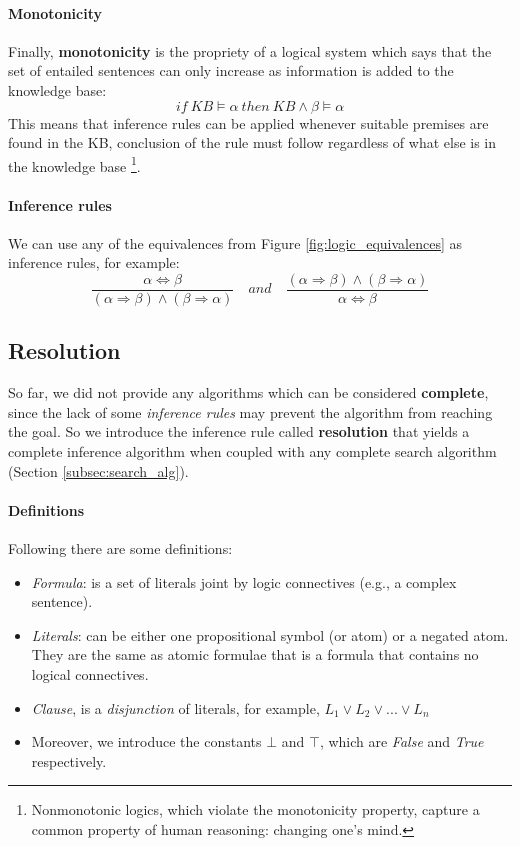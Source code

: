\documentclass[10pt,a4paper]{article}
\begin{document}
\paragraph{Monotonicity}
Finally, \textbf{monotonicity} is the propriety of a logical system  which says that the set of entailed sentences can only increase as information is added to the knowledge base:
\[if\ KB\models \alpha\ then \ KB\wedge\beta\models\alpha\]
This means that inference rules can be applied whenever suitable premises are found in the KB, conclusion of the rule must follow regardless of what else is in the knowledge base \footnote{Nonmonotonic logics, which violate the monotonicity property, capture a common property of human reasoning: changing one's mind.}.

\paragraph{Inference rules}
We can use any of the equivalences from Figure \ref{fig:logic_equivalences} as inference rules, for example:
\[\frac{\alpha \Leftrightarrow \beta }{(\alpha \Rightarrow \beta)\wedge(\beta\Rightarrow\alpha)}\quad and\quad \frac{(\alpha \Rightarrow \beta)\wedge(\beta\Rightarrow\alpha)}{\alpha \Leftrightarrow \beta }\]

\subsection{Resolution}
\label{sec:resolution}
So far, we did not provide any algorithms which can be considered \textbf{complete}, since the lack of some \textit{inference rules} may prevent the algorithm from reaching the goal. So we introduce the inference rule called \textbf{resolution} that yields a complete inference algorithm when coupled with any complete search algorithm (Section \ref{subsec:search_alg}).

\paragraph{Definitions}
Following there are some definitions:
\begin{itemize}
\item \textit{Formula}: is a set of literals joint by logic connectives (e.g., a complex sentence).
\item \textit{Literals}: can be either one propositional symbol (or atom) or a negated atom. They are the same as atomic formulae that is a formula that contains no logical connectives.
\item \textit{Clause}, is a \textit{disjunction} of literals, for example, $L_1\vee L_2\vee...\vee L_n$
\item Moreover, we introduce the constants $\bot$ and $\top$, which are \textit{False} and \textit{True} respectively.

\end{itemize}
\end{document}
